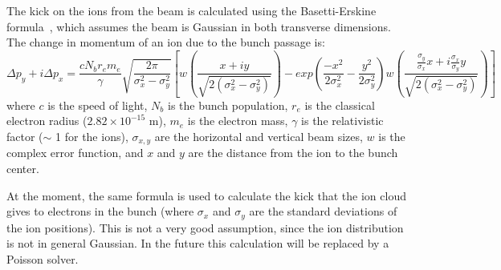 The kick on the ions from the beam is calculated using the
Basetti-Erskine formula~\cite{Bassetti}, which assumes the beam is
Gaussian in both transverse dimensions.  The change in momentum of an
ion due to the bunch passage is:
\begin{equation}
\Delta p_y + i \Delta p_x  = \frac{c N_b r_e m_e }{\gamma} \sqrt{\frac{2 \pi}{\sigma_x^2 - \sigma_y^2}} \left[ w\left(\frac{x + i y}{\sqrt{2 (\sigma_x^2 - \sigma_y^2)}}\right) 
   - exp\left(\frac{-x^2}{2 \sigma_x^2} - \frac{y^2}{2 \sigma_y^2}\right)  w\left(\frac{\frac{\sigma_y}{\sigma_x} x + i \frac{\sigma_x}{\sigma_y} y}{\sqrt{2 (\sigma_x^2 - \sigma_y^2)}}\right) \right]
\end{equation}
where $c$ is the speed of light, $N_b$ is the bunch population, $r_e$
is the classical electron radius ($2.82 \times 10^{-15}$ m), $m_e$ is
the electron mass, $\gamma$ is the relativistic factor ($\sim$ 1 for
the ions), $\sigma_{x,y}$ are the horizontal and vertical beam sizes,
$w$ is the complex error function, and $x$ and $y$ are the distance
from the ion to the bunch center.

At the moment, the same formula is used to calculate the kick that the
ion cloud gives to electrons in the bunch (where $\sigma_x$ and
$\sigma_y$ are the standard deviations of the ion positions).  This is
not a very good assumption, since the ion distribution is not in
general Gaussian.  In the future this calculation will be replaced by
a Poisson solver.
